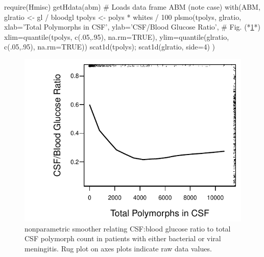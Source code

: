 \begin{Schunk}
\begin{Sinput}
require(Hmisc)
getHdata(abm)   # Loads data frame ABM (note case)
with(ABM, {
  glratio <- gl / bloodgl
  tpolys <- polys * whites / 100
  plsmo(tpolys, glratio, xlab='Total Polymorphs in CSF',
       ylab='CSF/Blood Glucose Ratio',    # Fig. (*\ref{fig:reg-glratio}*)
       xlim=quantile(tpolys,  c(.05,.95), na.rm=TRUE),
       ylim=quantile(glratio, c(.05,.95), na.rm=TRUE))
 scat1d(tpolys); scat1d(glratio, side=4) })
\end{Sinput}
\begin{figure}[htbp]

\centerline{\includegraphics{reg-glratio-1} }

\caption[ nonparametric smoother for glucose ratio]{ nonparametric smoother relating CSF:blood glucose ratio to total CSF polymorph count in patients with either bacterial or viral meningitis.  Rug plot on axes plots indicate raw data values.}\label{fig:reg-glratio}
\end{figure}
\end{Schunk}
